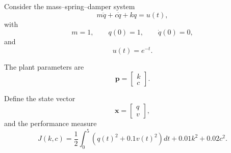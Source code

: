 Consider the mass--spring--damper system
\begin{equation}
m\ddot{q}
+
c\dot{q}
+
kq
=
u(t),
\end{equation}
with
\begin{equation}
m=1,
\qquad
q(0)=1,
\qquad
\dot{q}(0)=0,
\end{equation}
and
\begin{equation}
u(t)=e^{-t}.
\end{equation}

The plant parameters are
\begin{equation}
\mathbf{p}
=
\begin{bmatrix}
k\\
c
\end{bmatrix}.
\end{equation}

Define the state vector
\begin{equation}
\mathbf{x}
=
\begin{bmatrix}
q\\
v
\end{bmatrix},
\end{equation}
and the performance measure
\begin{equation}
J(k,c)
=
\frac{1}{2}
\int_0^5
\left(
q(t)^2
+
0.1v(t)^2
\right)dt
+
0.01k^2
+
0.02c^2.
\end{equation}

